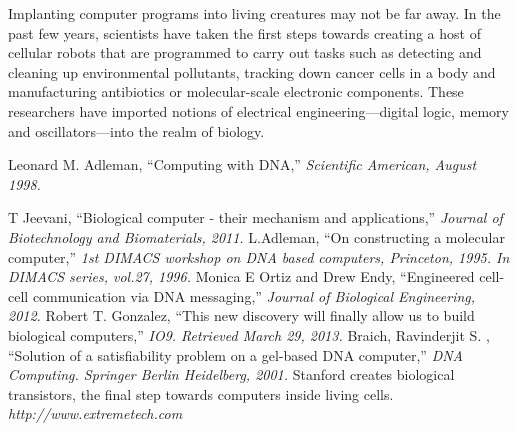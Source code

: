 Implanting computer programs into living creatures may not be far away. In the past few years, scientists have taken the first steps towards creating a host of cellular robots that are programmed to carry out tasks such as detecting and cleaning up environmental pollutants, tracking down cancer cells in a body and manufacturing antibiotics or molecular-scale electronic components. These researchers have imported notions of electrical engineering—digital logic, memory and oscillators—into the realm of biology.
\newpage
\begin{thebibliography}{9}
  Leonard  M.  Adleman, 
  ``Computing  with  DNA,''
    \emph{Scientific  American, August 1998.}
  
  T Jeevani, 
  ``Biological computer - their mechanism and applications,'' 
  \emph{Journal of Biotechnology and Biomaterials, 2011.}
  L.Adleman, ``On  constructing  a  molecular  computer,'' 
  \emph{1st  DIMACS  workshop  on  DNA  based  computers,  Princeton,  1995.  In  DIMACS series, vol.27, 1996.}
  Monica E Ortiz and Drew Endy,
  ``Engineered cell-cell communication via DNA messaging,''
  \emph{Journal of Biological Engineering, 2012.}
  Robert T. Gonzalez, 
  ``This new discovery will finally allow us to build biological computers,''
  \emph{IO9. Retrieved March 29, 2013.}
  Braich, Ravinderjit S. ,
  ``Solution of a satisfiability problem on a gel-based DNA computer,''
  \emph{DNA Computing. Springer Berlin Heidelberg, 2001.}
	Stanford creates biological transistors, the final step towards computers inside living cells.
  \emph{http://www.extremetech.com}
\end{thebibliography}  


